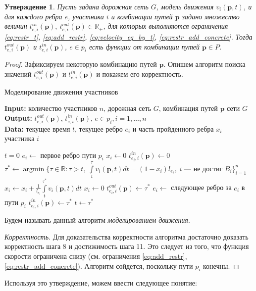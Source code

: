 \documentclass[12pt, a4paper]{article}
\DeclareMathOperator*{\argmin}{argmin}
\newtheorem{state}{Утверждение}[section]
\begin{document}
\begin{state}
\label{state:modeling}
Пусть задана дорожная сеть $G$, модель движения $v_i(\textbf{p}, t)$, и для каждого ребра $e$, участника $i$ и комбинации путей $\textbf{p}$ задано множество величин $t_{e, i}^{in}(\textbf{p}), \: t_{e, i}^{out}(\textbf{p}) \in \mathbb{R}_+$, для которых выполняются ограничения \eqref{eq:restr_t}, \eqref{eq:add_restr}, \eqref{eq:velocity_eq_by_t}, \eqref{eq:restr_add_concrete}. Тогда $t_{e, i}^{out}(\textbf{p})$ и $t_{e, i}^{in}(\textbf{p})$, $e \in p_i$ есть функции от комбинации путей $\textbf{p} \in P$.
\end{state}
\begin{proof}
Зафиксируем некоторую комбинацию путей $\textbf{p}$. Опишем алгоритм поиска значений $t_{e, i}^{out}(\textbf{p})$ и $t_{e, i}^{in}(\textbf{p})$ и покажем его корректность.

\begin{algorithm}[H]
	\caption{Моделирование движения участников}
	\label{alg:modeling}
	{\bf {Input:}} количество участников $n$, дорожная сеть $G$, комбинация путей $\textbf{p}$ сети $G$\\
	{\bf {Output:}} $t_{e, i}^{out}(\textbf{p})$, $t_{e, i}^{in}(\textbf{p})$, $e \in p_i, i = 1, \ldots, n$\\
	{\bf {Data:}} текущее время $t$, текущее ребро $e_i$ и часть пройденного ребра $x_i$ участника $i$
	\begin{algorithmic}[1]
		\State $t = 0$
		\State $e_i \gets$ { первое ребро пути $p_i$}
		\State $x_i \gets 0$
		\State $t_{e_i, i}^{in}(\textbf{p}) \gets 0$ 
		\EndFor
		\State $\tau^* \gets \argmin\{ \tau \in \mathbb{R}: \tau > t, \; \int\limits_{t}^{\tau} v_i(\textbf{p}, t) dt = (1 - x_i) l_{e_i}, \; i \text { --- не достиг } B_i  \}_{i = 1}^n$
		\State $x_i \gets x_i + \frac{1}{l_{e_i}} \int\limits_{t}^{\tau^*} v_i(\textbf{p}, t) dt$
				\State $x_i \gets 0$
				\State $t_{e_i, i}^{out}(\textbf{p}) \gets \tau^*$ 
				\State $e_i \gets$ следующее ребро за $e_i$ в пути $p_i$
				\State $t_{e_i, i}^{in}(\textbf{p}) \gets \tau^*$ 
			\EndIf
		\EndFor
		\State $t \gets \tau^*$
		\EndWhile
	\end{algorithmic}
\end{algorithm}


Будем называть данный алгоритм \textit{моделированием движения}.

\textit{Корректность}. Для доказательства корректности алгоритма достаточно доказать корректность шага 8 и достижимость шага 11. Это следует из того, что функция скорости ограничена снизу (см. ограничения \eqref{eq:add_restr}, \eqref{eq:restr_add_concrete}). Алгоритм сойдется, поскольку пути $p_i$ конечны.

\end{proof}
 Используя это утверждение, можем ввести следующее понятие:
\end{document}
